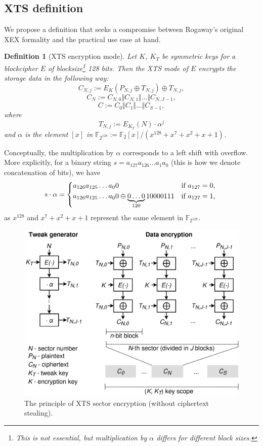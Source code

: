 \documentclass[a4paper]{article}
\newtheorem{definition}{Definition}
\begin{document}
\subsection{XTS definition}\label{sec:xts-definition}
We propose a definition that seeks a compromise between Rogaway's original XEX formality and the practical use case at hand.
\begin{definition}[XTS encryption mode]
    Let $K$, $K_T$ be symmetric keys for a blockcipher $E$ of blocksize\footnote{This is not essential, but multiplication by $\alpha$ differs for different block sizes.} 128 bits. Then the XTS mode of $E$ encrypts the storage data in the following way:
    $$C_{N,j} :=
    E_K(P_{N,j} \oplus T_{N,j}) \oplus T_{N,j},$$
    $$C_N := C_{N,0} \Vert C_{N,1} \Vert \dots \Vert C_{N,J-1},$$
    $$C := C_0 \Vert C_1 \Vert \dots \Vert C_{S-1},$$
    where $$T_{N,j} := E_{K_T}(N) \cdot \alpha ^ j$$
    and $\alpha$ is the element $[x]$ in $\mathbb{F}_{2^{128}}:= \mathbb{F}_{2}[x]/(x^{128} + x^7 + x^2 + x + 1)$.
\end{definition}

Conceptually, the multiplication by $\alpha$ corresponds to a left shift with overflow. More explicitly, for a binary string $s = a_{127}a_{126}\dots a_1a_0$ (this is how we denote concatenation of bits), we have
\[ s\cdot \alpha =
    \begin{cases*}
        a_{126}a_{125}\dots a_0 0 & if $a_{127} = 0$,  \\
        a_{126}a_{125}\dots a_0 0 \oplus \underbrace{0\dots 0}_{120}10000111 & if $a_{127} = 1$,
    \end{cases*} \]%
as $x^{128}$ and $x^7 + x^2 + x + 1$ represent the same element in
$\mathbb{F}_{2^{128}}$.
\newpage

\begin{figure}[ht]
\begin{center}
    \includegraphics[width=0.88\linewidth]{xts2.png}
    \caption{The principle of XTS sector encryption (without ciphertext stealing).}
    \label{fig:xts}
\end{center}
\end{figure}
\end{document}
